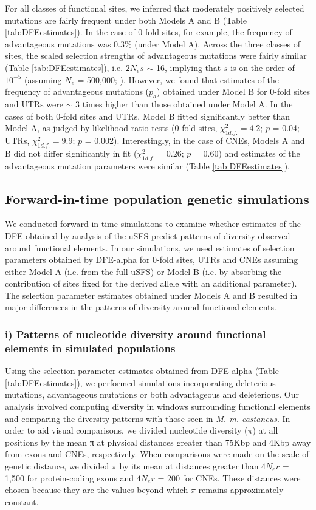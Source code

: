 	For all classes of functional sites, we inferred that moderately positively selected mutations are fairly frequent under both Models A and B (Table \ref{tab:DFEestimates}). In the case of 0-fold sites, for example, the frequency of advantageous mutations was 0.3\% (under Model A). Across the three classes of sites, the scaled selection strengths of advantageous mutations were fairly similar (Table \ref{tab:DFEestimates}), i.e. $2N_es$ $\sim$ 16, implying that $s$ is on the order of $10^{-5}$ (assuming $N_e$ = 500,000; \cite{RN315}). However, we found that estimates of the frequency of advantageous mutations ($p_a$) obtained under Model B for 0-fold sites and UTRs were $\sim$ 3 times higher than those obtained under Model A. In the cases of both 0-fold sites and UTRs, Model B fitted significantly better than Model A, as judged by likelihood ratio tests (0-fold sites, $\chi^{2}_{1 d.f.} = 4.2$; $p$ = 0.04; UTRs, $\chi^{2}_{1 d.f.}= 9.9$; $p$ = 0.002). Interestingly, in the case of CNEs, Models A and B did not differ significantly in fit ($\chi^{2}_{1 d.f.} = 0.26$; $p$ = 0.60) and estimates of the advantageous mutation parameters were similar (Table \ref{tab:DFEestimates}). 

\subsection{Forward-in-time population genetic simulations}

        	We conducted forward-in-time simulations to examine whether estimates of the DFE obtained by analysis of the uSFS predict patterns of diversity observed around functional elements. In our simulations, we used estimates of selection parameters obtained by DFE-alpha for 0-fold sites, UTRs and CNEs assuming either Model A (i.e. from the full uSFS) or Model B (i.e. by absorbing the contribution of sites fixed for the derived allele with an additional parameter). The selection parameter estimates obtained under Models A and B resulted in major differences in the patterns of diversity around functional elements.

\subsubsection{i) Patterns of nucleotide diversity around functional elements in simulated populations}

	Using the selection parameter estimates obtained from DFE-alpha (Table \ref{tab:DFEestimates}), we performed simulations incorporating deleterious mutations, advantageous mutations or both advantageous and deleterious. Our analysis involved computing diversity in windows surrounding functional elements and comparing the diversity patterns with those seen in \textit{M. m. castaneus}. In order to aid visual comparisons, we divided nucleotide diversity ($\pi$) at all positions by the mean π at physical distances greater than 75Kbp and 4Kbp away from exons and CNEs, respectively. When comparisons were made on the scale of genetic distance, we divided $\pi$ by its mean at distances greater than $4N_er$ = 1,500 for protein-coding exons and $4N_er$ = 200 for CNEs. These distances were chosen because they are the values beyond which $\pi$ remains approximately constant. 

